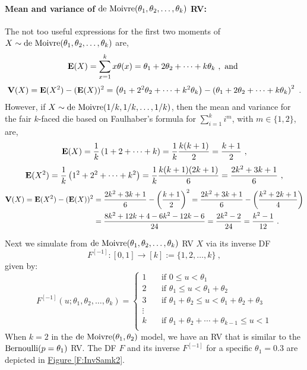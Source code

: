 \paragraph{Mean and variance of $\mbox{{\rm de~Moivre}} (\theta_1,\theta_2,\ldots,\theta_k)$ RV:}
The not too useful expressions for the first two moments of $X \sim \mbox{{\rm de~Moivre}} (\theta_1,\theta_2,\ldots,\theta_k)$ are,
\[
\mathbf{E}(X) = \sum_{x=1}^k x \theta(x) =  \theta_1 + 2 \theta_2 + \cdots + k \theta_k \ , \text{ and }
\]
\[
\mathbf{V}(X) = \mathbf{E}(X^2) - (\mathbf{E}(X))^2 =   \left(\theta_1 + 2^2 \theta_2 + \cdots + k^2 \theta_k \right) - \left( \theta_1 + 2 \theta_2 + \cdots + k \theta_k \right)^2 \ .
\]
However, if $X\sim \mbox{{\rm de~Moivre}}(1/k,1/k,\ldots,1/k)$, then the mean and variance for the fair $k$-faced die based on Faulhaber's formula for $\sum_{i=1}^k i^m$, with $m\in\{1,2\}$, are,
\[
\e(X) = \frac{1}{k} \left( 1+2+\cdots+k \right)= \frac{1}{k} \frac{k(k+1)}{2} = \frac{k+1}{2}  \ ,
\]
\[
\mathbf{E}(X^2) = \frac{1}{k} \left( 1^2+2^2+\cdots+k^2 \right)  = \frac{1}{k} \frac{k(k+1)(2k+1)}{6} =  \frac{2k^2+3k+1}{6} \ ,
\]
\begin{align}
\mathbf{V}(X) = \mathbf{E}(X^2) - (\mathbf{E}(X))^2
&= \frac{2k^2+3k+1}{6} -  \left( \frac{k+1}{2} \right)^2 = \frac{2k^2+3k+1}{6} -  \left( \frac{k^2+2k+1}{4} \right) \notag \\
&=  \frac{8k^2+12k+4 - 6k^2-12k-6}{24} =  \frac{2k^2-2}{24} = \frac{k^2-1}{12} \notag \ .
\end{align}

Next we simulate from $\mbox{{\rm de~Moivre}}(\theta_1,\theta_2,\ldots,\theta_k)$ RV $X$ via its inverse DF $$F^{[-1]}: [0,1] \rightarrow [k] := \{1,2,\ldots,k\} \ ,$$ given by:
\begin{equation}\label{E:deMoivreInverseDF}
F^{[-1]}(u;\theta_1,\theta_2,\ldots,\theta_k) =
\begin{cases}
1 & \quad \text{if $0 \leq u < \theta_1$}\\
2 & \quad \text{if $\theta_1 \leq u < \theta_1+\theta_2$} \\
3 & \quad \text{if $\theta_1+\theta_2 \leq u < \theta_1+\theta_2+\theta_3$} \\
\vdots & \\
k & \quad \text{if $\theta_1+\theta_2+\cdots+\theta_{k-1} \leq u < 1$} \\
\end{cases}
\end{equation}
When $k=2$ in the $\mbox{{\rm de~Moivre}}(\theta_1,\theta_2)$ model, we have an RV that is similar to the $\mbox{{\rm Bernoulli}}(p=\theta_1)$ RV.  The DF $F$ and its inverse $F^{[-1]}$ for a specific $\theta_1=0.3$ are depicted in \hyperref[F:InvSamk2]{Figure \ref*{F:InvSamk2}}.

